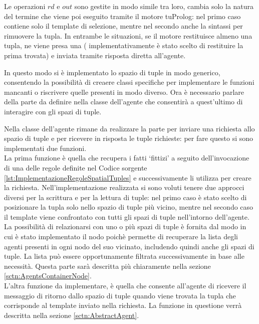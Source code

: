Le operazioni $rd$ e $out$ sono gestite in modo simile tra loro, cambia solo la natura del termine che viene poi eseguito tramite il motore tuProlog: nel primo caso contiene solo il template di selezione, mentre nel secondo anche la sintassi per rimuovere la tupla.
In entrambe le situazioni, se il motore restituisce almeno una tupla, ne viene presa una ( implementativamente è stato scelto di restituire la prima trovata) e inviata tramite risposta diretta all'agente.

In questo modo si è implementato lo spazio di tuple in modo generico, consentendo la possibilità di creaere classi specifiche per implementare le funzioni mancanti o riscrivere quelle presenti in modo diverso.
Ora è necessario parlare della parte da definire nella classe dell'agente che consentirà a quest'ultimo di interagire con gli spazi di tuple.

Nella classe dell'agente rimane da realizzare la parte per inviare una richiesta allo spazio di tuple e per ricevere in risposta le tuple richieste: per fare questo si sono implementati due funzioni.
\\
La prima funzione è quella che recupera i fatti `fittizi' a seguito dell'invocazione di una delle regole definite nel Codice sorgente \ref{lst:ImplementazioneRegoleSpatialTuples} e successivamente li utilizza per creare la richiesta. Nell'implementazione realizzata si sono voluti tenere due approcci diversi per la scrittura e per la lettura di tuple: nel primo caso è stato scelto di posizionare la tupla solo nello spazio di tuple più vicino, mentre nel secondo caso il template viene confrontato con tutti gli spazi di tuple nell'intorno dell'agente.
La possibilità di relazionarsi con uno o più spazi di tuple è fornita dal modo in cui è stato implementato il nodo poichè permette di recuperare la lista degli agenti presenti in ogni nodo del suo vicinato, includendo quindi anche gli spazi di tuple. La lista può essere opportunamente filtrata successivamente in base alle necessità. Questa parte sarà descritta più chiaramente nella sezione \ref{sctn:AgentsContainerNode}.
\\
L'altra funzione da implementare, è quella che consente all'agente di ricevere il messaggio di ritorno dallo spazio di tuple quando viene trovata la tupla che corrisponde al template inviato nella richiesta. La funzione in questione verrà descritta nella sezione \ref{sctn:AbstractAgent}.
